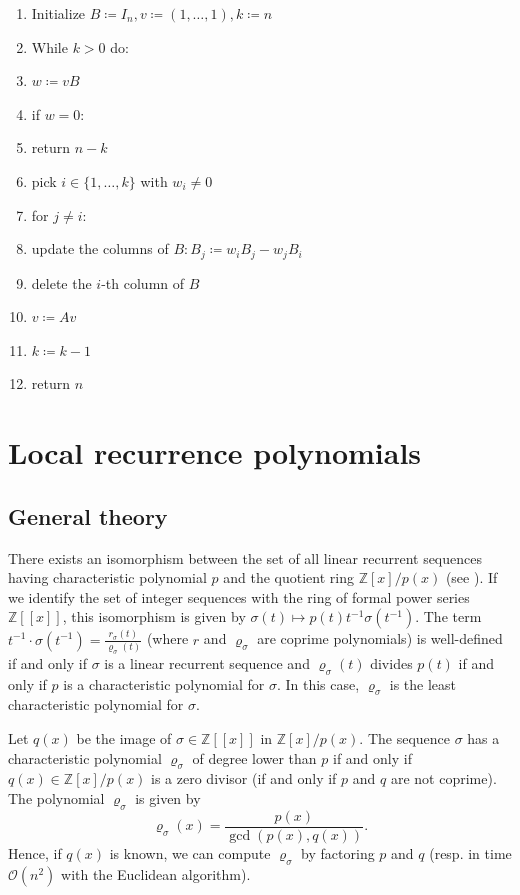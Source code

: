 \documentclass[a4paper,12pt]{article}
\begin{document}
\begin{enumerate}[topsep=0pt,itemsep=-1ex,partopsep=1ex,parsep=1ex]
\item Initialize $B \coloneqq I_n, v \coloneqq (1, \ldots, 1), k \coloneqq n$
\item While $k>0$ do:
\item \quad $w \coloneqq v B$
\item \quad if $w = 0$:
\item \quad \quad return $n-k$
\item \quad pick $i\in\{1, \ldots, k\}$ with $w_i \neq 0$
\item \quad for $j \neq i$:
\item \quad \quad update the columns of $B\colon B_j \coloneqq w_i B_j - w_j B_i$
\item \quad delete the $i$-th column of $B$
\item \quad $v \coloneqq Av$
\item \quad $k \coloneqq k-1$
\item return $n$
\end{enumerate}

\section{Local recurrence polynomials}

\subsection{General theory}

There exists an isomorphism between the set of all linear recurrent sequences having characteristic polynomial $p$ and the quotient ring $\mathbb{Z}[x]/p(x)$ (see \cite{hall1938isomorphism}). If we identify the set of integer sequences with the ring of formal power series $\mathbb{Z}[[x]]$, this isomorphism is given by $\sigma(t) \mapsto p(t) t^{-1} \sigma\left(t^{-1}\right)$. The term $t^{-1}\cdot \sigma\left(t^{-1}\right) = \frac {r_\sigma(t)}{\varrho_\sigma(t)}$ (where $r$ and $\varrho_\sigma$ are coprime polynomials) is well-defined if and only if $\sigma$ is a linear recurrent sequence and $\varrho_\sigma(t)$ divides $p(t)$ if and only if $p$ is a characteristic polynomial for $\sigma$. In this case, $\varrho_\sigma$ is the least characteristic polynomial for $\sigma$.

Let $q(x)$ be the image of $\sigma \in \mathbb{Z}[[x]]$ in $\mathbb{Z}[x]/p(x)$. The sequence $\sigma$ has a characteristic polynomial $\varrho_\sigma$ of degree lower than $p$ if and only if $q(x) \in \mathbb{Z}[x]/p(x)$ is a zero divisor (if and only if $p$ and $q$ are not coprime). The polynomial $\varrho_\sigma$ is given by 
$$
\varrho_\sigma(x) = \frac {p(x)} {\gcd(p(x), q(x))}.
$$
Hence, if $q(x)$ is known, we can compute $\varrho_\sigma$ by factoring $p$ and $q$ (resp. in time $\mathcal{O}(n^2)$ with the Euclidean algorithm).
\end{document}
